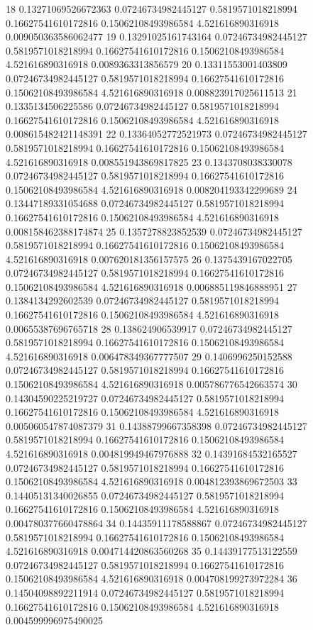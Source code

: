{18 0.13271069526672363 0.07246734982445127 0.5819571018218994 0.16627541610172816 0.15062108493986584 4.521616890316918 0.009050363586062477
19 0.13291025161743164 0.07246734982445127 0.5819571018218994 0.16627541610172816 0.15062108493986584 4.521616890316918 0.0089363313856579
20 0.13311553001403809 0.07246734982445127 0.5819571018218994 0.16627541610172816 0.15062108493986584 4.521616890316918 0.008823917025611513
21 0.1335134506225586 0.07246734982445127 0.5819571018218994 0.16627541610172816 0.15062108493986584 4.521616890316918 0.008615482421148391
22 0.13364052772521973 0.07246734982445127 0.5819571018218994 0.16627541610172816 0.15062108493986584 4.521616890316918 0.008551943869817825
23 0.1343708038330078 0.07246734982445127 0.5819571018218994 0.16627541610172816 0.15062108493986584 4.521616890316918 0.008204193342299689
24 0.13447189331054688 0.07246734982445127 0.5819571018218994 0.16627541610172816 0.15062108493986584 4.521616890316918 0.008158462388174874
25 0.1357278823852539 0.07246734982445127 0.5819571018218994 0.16627541610172816 0.15062108493986584 4.521616890316918 0.007620181356157575
26 0.1375439167022705 0.07246734982445127 0.5819571018218994 0.16627541610172816 0.15062108493986584 4.521616890316918 0.006885119846888951
27 0.1384134292602539 0.07246734982445127 0.5819571018218994 0.16627541610172816 0.15062108493986584 4.521616890316918 0.00655387696765718
28 0.138624906539917 0.07246734982445127 0.5819571018218994 0.16627541610172816 0.15062108493986584 4.521616890316918 0.006478349367777507
29 0.1406996250152588 0.07246734982445127 0.5819571018218994 0.16627541610172816 0.15062108493986584 4.521616890316918 0.005786776542663574
30 0.14304590225219727 0.07246734982445127 0.5819571018218994 0.16627541610172816 0.15062108493986584 4.521616890316918 0.005060547874087379
31 0.14388799667358398 0.07246734982445127 0.5819571018218994 0.16627541610172816 0.15062108493986584 4.521616890316918 0.004819949467976888
32 0.14391684532165527 0.07246734982445127 0.5819571018218994 0.16627541610172816 0.15062108493986584 4.521616890316918 0.004812393869672503
33 0.14405131340026855 0.07246734982445127 0.5819571018218994 0.16627541610172816 0.15062108493986584 4.521616890316918 0.004780377660478864
34 0.14435911178588867 0.07246734982445127 0.5819571018218994 0.16627541610172816 0.15062108493986584 4.521616890316918 0.004714420863560268
35 0.14439177513122559 0.07246734982445127 0.5819571018218994 0.16627541610172816 0.15062108493986584 4.521616890316918 0.004708199273972284
36 0.14504098892211914 0.07246734982445127 0.5819571018218994 0.16627541610172816 0.15062108493986584 4.521616890316918 0.004599996975490025
}
